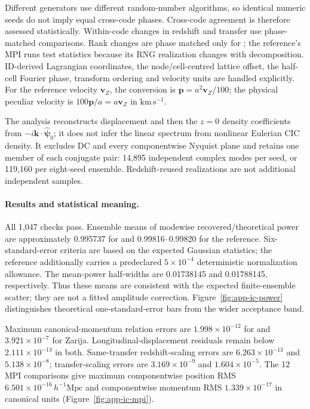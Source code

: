 Different generators use different random-number algorithms, so identical
numeric seeds do not imply equal cross-code phases.  Cross-code agreement is
therefore assessed statistically.  Within-code changes in redshift and transfer
use phase-matched comparisons.  Rank changes are phase matched only for \IPPL;
the reference's MPI runs test statistics because its RNG realization changes
with decomposition.  ID-derived Lagrangian
coordinates, the node/cell-centred lattice offset, the half-cell Fourier phase,
transform ordering and velocity units are handled explicitly.  For the reference
velocity $\boldsymbol v_Z$, the conversion is
$\boldsymbol p=a^2\boldsymbol v_Z/100$; the physical peculiar velocity is
$100\boldsymbol p/a=a\boldsymbol v_Z$ in $\mathrm{km}\,\mathrm{s}^{-1}$.

The analysis reconstructs displacement and then the $z=0$ density coefficients
from $-i\boldsymbol k\cdot\widehat{\boldsymbol\psi}_0$; it does not infer the
linear spectrum from nonlinear Eulerian CIC density.  It excludes DC and every
componentwise Nyquist plane and retains one member of each conjugate pair:
14,895 independent complex modes per seed, or 119,160 per eight-seed ensemble.
Redshift-reused realizations are not additional independent samples.

\paragraph{Results and statistical meaning.}
All 1,047 checks pass.  Ensemble means of modewise recovered/theoretical power
are approximately 0.995737 for \IPPL and 0.99816--0.99820 for the reference.
Six-standard-error criteria are based on the expected Gaussian statistics;
the reference additionally carries a predeclared $5\times10^{-4}$ deterministic
normalization allowance.  The mean-power half-widths are 0.01738145 and
0.01788145, respectively.  Thus these means are consistent with the expected
finite-ensemble scatter; they are not a fitted amplitude correction.
Figure~\ref{fig:app-ic-power} distinguishes theoretical one-standard-error bars
from the wider acceptance band.

Maximum canonical-momentum relation errors are $1.998\times10^{-12}$ for
\IPPL and $3.921\times10^{-7}$ for Zarija.  Longitudinal-displacement residuals
remain below $2.111\times10^{-13}$ in both.  Same-transfer redshift-scaling
errors are $6.263\times10^{-13}$ and $5.138\times10^{-8}$; transfer-scaling
errors are $3.169\times10^{-9}$ and $1.604\times10^{-5}$.
The 12 \IPPL MPI comparisons give maximum componentwise position RMS
$6.501\times10^{-16}\,h^{-1}\mathrm{Mpc}$ and componentwise momentum RMS
$1.339\times10^{-17}$ in canonical units
(Figure~\ref{fig:app-ic-mpi}).

